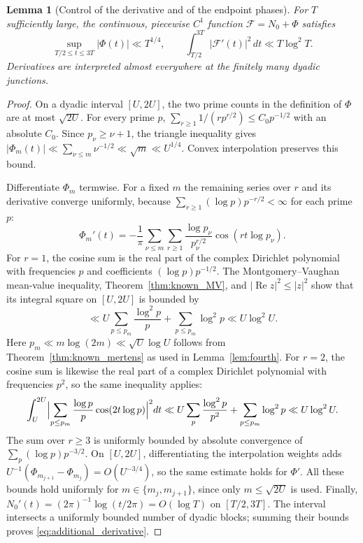 \documentclass[11pt,a4paper]{article}
\makeatletter
\numberwithin{equation}{section}
\DeclareRobustCommand{\CGref}[1]{\ref{#1}}
\DeclareRobustCommand{\CGeqref}[1]{\eqref{#1}}
\let\CG@origref\ref
\let\CG@origeqref\eqref
\newcommand{\CG@gettip}[1]{\@ifundefined{CGTip@#1}{#1}{\csname CGTip@#1\endcsname}}
\DeclareRobustCommand{\CGref}[1]{\pdftooltip{\CG@origref{#1}}{\CG@gettip{#1}}}
\DeclareRobustCommand{\CGeqref}[1]{\pdftooltip{\CG@origeqref{#1}}{\CG@gettip{#1}}}
\newtheorem{lemma}[theorem]{Lemma}
\theoremstyle{definition}
\theoremstyle{remark}
\newcommand{\Nz}{N_0} %
\newcommand{\Fc}{\mathcal F}
\newcommand{\Ph}{\Phi}
\makeatother
\begin{document}
\begin{lemma}[Control of the derivative and of the endpoint phases]\label{lem:additional_derivative}
For $T$ sufficiently large, the continuous, piecewise $C^1$ function $\Fc=\Nz+\Ph$ satisfies
\begin{equation}
\sup_{T/2\le t\le3T}|\Ph(t)|\ll T^{1/4},
\qquad
\int_{T/2}^{3T}|\Fc'(t)|^2\,dt\ll T\log^2T.
\label{eq:additional_derivative}
\end{equation}
Derivatives are interpreted almost everywhere at the finitely many dyadic junctions.
\end{lemma}
\begin{proof}
On a dyadic interval $[U,2U]$, the two prime counts in the definition of
$\Ph$ are at most $\sqrt{2U}$. For every prime $p$,
$\sum_{r\ge1}1/(rp^{r/2})\le C_0p^{-1/2}$ with an absolute $C_0$.
Since $p_\nu\ge\nu+1$, the triangle inequality gives
$|\Ph_m(t)|\ll\sum_{\nu\le m}\nu^{-1/2}\ll\sqrt m\ll U^{1/4}$.
Convex interpolation preserves this bound.

Differentiate $\Ph_m$ termwise. For a fixed $m$ the remaining series over $r$ and its derivative converge uniformly, because $\sum_{r\ge1}(\log p)p^{-r/2}<\infty$ for each prime $p$:
\begin{equation}
\Ph_m'(t)=-\frac1\pi\sum_{\nu\le m}\sum_{r\ge1}
\frac{\log p_\nu}{p_\nu^{r/2}}\cos(rt\log p_\nu).
\label{eq:disp_40}
\end{equation}
For $r=1$, the cosine sum is the real part of the complex Dirichlet polynomial with frequencies $p$ and coefficients $(\log p)p^{-1/2}$.
The Montgomery--Vaughan mean-value inequality, Theorem~\CGref{thm:known_MV}, and $|\operatorname{Re}z|^2\le|z|^2$ show that its integral square on
$[U,2U]$ is bounded by
\begin{equation}
\ll U\sum_{p\le p_m}\frac{\log^2p}{p}
 +\sum_{p\le p_m}\log^2p
\ll U\log^2U.
\label{eq:disp_41}
\end{equation}
Here $p_m\ll m\log(2m)\ll\sqrt U\log U$ follows from
Theorem~\CGref{thm:known_mertens} as used in Lemma~\CGref{lem:fourth}.
For $r=2$, the cosine sum is likewise the real part of a complex Dirichlet polynomial with frequencies $p^2$, so the same inequality applies:
\begin{equation}
\int_U^{2U}\Bigl|\sum_{p\le p_m}
\frac{\log p}{p}\cos(2t\log p)\Bigr|^2dt
\ll U\sum_p\frac{\log^2p}{p^2}
+\sum_{p\le p_m}\log^2p
\ll U\log^2U.
\label{eq:disp_42}
\end{equation}
The sum over $r\ge3$ is uniformly bounded by absolute convergence of
$\sum_p(\log p)p^{-3/2}$.
On $[U,2U]$, differentiating the interpolation weights adds
$U^{-1}(\Ph_{m_{j+1}}-\Ph_{m_j})=O(U^{-3/4})$, so the same estimate holds
for $\Ph'$.
All these bounds hold uniformly for $m\in\{m_j,m_{j+1}\}$, since only $m\le\sqrt{2U}$ is used.
Finally, $\Nz'(t)=(2\pi)^{-1}\log(t/2\pi)=O(\log T)$ on
$[T/2,3T]$. The interval intersects a uniformly bounded number of dyadic blocks;
summing their bounds proves \CGeqref{eq:additional_derivative}.
\end{proof}
\end{document}
